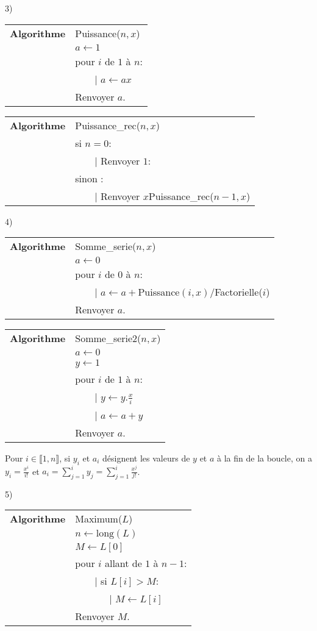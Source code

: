 \documentclass[11pt,a4paper]{article}
\begin{document}
3)

\begin{tabular}{ll}
\textbf{Algorithme} &Puissance($n,x$) \\
&$a\leftarrow 1$\\
&  pour $i$ de $1$ à $n$:\\
&\ \ \ {\ \rm |} $a\leftarrow ax$\\
& Renvoyer $a$.
\end{tabular}

\begin{tabular}{ll}
\textbf{Algorithme} &Puissance\_rec($n,x$) \\
&si $n=0$:\\
& \ \ \ {\ \rm |} Renvoyer $1$:\\
& sinon :\\
& \ \ \ {\ \rm |} Renvoyer $x$Puissance\_rec($n-1,x$)
\end{tabular}


4)

 \begin{tabular}{ll}
\textbf{Algorithme} &Somme\_serie($n,x$) \\
& $a\leftarrow 0$ \\
& pour $i$ de $0$ à $n$:\\
& \ \ \ {\ \rm |}  $a\leftarrow a+$Puissance$(i,x)$/Factorielle($i$)\\
& Renvoyer $a$.
\end{tabular}

\begin{tabular}{ll}
\textbf{Algorithme} &Somme\_serie2($n,x$) \\
& $a\leftarrow 0$ \\
& $y\leftarrow 1$\\
& pour $i$ de $1$ à $n$:\\
& \ \ \ {\ \rm |} $y\leftarrow y. \frac{x}{i}$\\
& \ \ \ {\ \rm |}  $a\leftarrow a+y$\\
& Renvoyer $a$.
\end{tabular}

Pour $i\in \llbracket 1,n\rrbracket$, si $y_i$ et $a_i$ désignent les valeurs de $y$ et  $a$ à la fin de la boucle, on a $y_i=\frac{x^i}{i!}$ et $a_i=\sum_{j=1}^i y_j=\sum_{j=1}^i \frac{x^j}{j!}$. 

5) \begin{tabular}{ll}
\textbf{Algorithme} &Maximum($L$) \\
& $n\leftarrow \mathrm{long}(L)$ \\
& $M\leftarrow L[0]$\\
& pour $i$ allant de $1$ à $n-1$:\\
& \ \ \ {\ \rm |} si $L[i]>M$:\\
& \ \ \ \ \ \ {\ \rm |}  $M\leftarrow L[i]$\\
& Renvoyer $M$.
\end{tabular}
\end{document}
